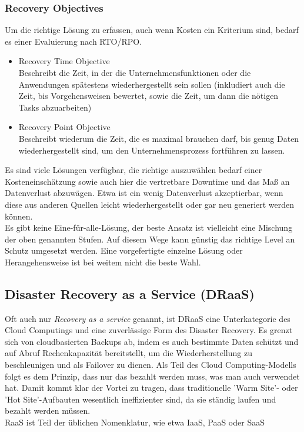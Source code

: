 \documentclass[letterpaper, 12pt]{article}
\let\tempsubsection\subsection
\renewcommand\subsection[1]{\vspace{0cm}\tempsubsection{#1}\vspace{0cm}}
\let\tempsubsubsection\subsubsection
\renewcommand\subsubsection[1]{\vspace{0cm}\tempsubsubsection{#1}\vspace{0cm}}
\begin{document}
\subsubsection{Recovery Objectives}
Um die richtige Lösung zu erfassen, auch wenn Kosten ein Kriterium sind, bedarf es einer Evaluierung nach RTO/RPO.

\begin{itemize}
	\item Recovery Time Objective \\
	Beschreibt die Zeit, in der die Unternehmensfunktionen oder die Anwendungen spätestens wiederhergestellt sein sollen (inkludiert auch die Zeit, bis Vorgehensweisen bewertet, sowie die Zeit, um dann die nötigen Tasks abzuarbeiten)
	\item Recovery Point Objective \\
	Beschreibt wiederum die Zeit, die es maximal brauchen darf, bis genug Daten wiederhergestellt sind, um den Unternehmensprozess fortführen zu lassen.
\end{itemize}

Es sind viele Lösungen verfügbar, die richtige auszuwählen bedarf einer Kosteneinschätzung sowie auch hier die vertretbare Downtime und das Maß an Datenverlust abzuwägen. Etwa ist ein wenig Datenverlust akzeptierbar, wenn diese aus anderen Quellen leicht wiederhergestellt oder gar neu generiert werden können. \\ Es gibt keine Eine-für-alle-Lösung, der beste Ansatz ist vielleicht eine Mischung der oben genannten Stufen. Auf diesem Wege kann günstig das richtige Level an Schutz umgesetzt werden. Eine vorgefertigte einzelne Lösung oder Herangehensweise ist bei weitem nicht die beste Wahl.

\subsection{Disaster Recovery as a Service (DRaaS) \cite{draas}}
Oft auch nur \textit{Recovery as a service} genannt, ist DRaaS eine Unterkategorie des Cloud Computings und eine zuverlässige Form des Disaster Recovery. Es grenzt sich von cloudbasierten Backups ab, indem es auch bestimmte Daten schützt und auf Abruf Rechenkapazität bereitstellt, um die Wiederherstellung zu beschleunigen und als Failover zu dienen. Als Teil des Cloud Computing-Modells folgt es dem Prinzip, dass nur das bezahlt werden muss, was man auch verwendet hat. Damit kommt klar der Vortei zu tragen, dass traditionelle 'Warm Site'- oder 'Hot Site'-Aufbauten wesentlich ineffizienter sind, da sie ständig laufen und bezahlt werden müssen. \\
RaaS ist Teil der üblichen Nomenklatur, wie etwa IaaS, PaaS oder SaaS 
\end{document}
